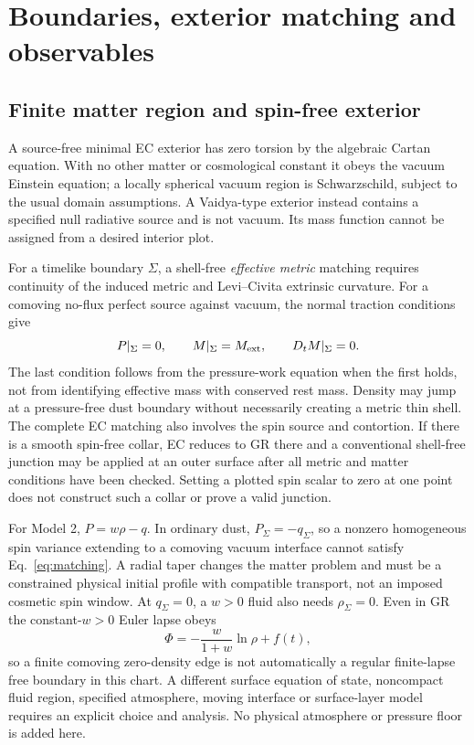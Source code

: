 \section{Boundaries, exterior matching and observables}
\subsection{Finite matter region and spin-free exterior}
A source-free minimal EC exterior has zero torsion by the algebraic Cartan equation. With no other matter or cosmological constant it obeys the vacuum Einstein equation; a locally spherical vacuum region is Schwarzschild, subject to the usual domain assumptions. A Vaidya-type exterior instead contains a specified null radiative source and is not vacuum. Its mass function cannot be assigned from a desired interior plot.

For a timelike boundary $\Sigma$, a shell-free \emph{effective metric} matching requires continuity of the induced metric and Levi--Civita extrinsic curvature. For a comoving no-flux perfect source against vacuum, the normal traction conditions give
\begin{equation}\label{eq:matching}
 P|_\Sigma=0,\qquad M|_\Sigma=M_{\rm ext},\qquad D_t M|_\Sigma=0.
\end{equation}
The last condition follows from the pressure-work equation when the first holds, not from identifying effective mass with conserved rest mass. Density may jump at a pressure-free dust boundary without necessarily creating a metric thin shell. The complete EC matching also involves the spin source and contortion. If there is a smooth spin-free collar, EC reduces to GR there and a conventional shell-free junction may be applied at an outer surface after all metric and matter conditions have been checked. Setting a plotted spin scalar to zero at one point does not construct such a collar or prove a valid junction.

For Model 2, $P=w\rho-q$. In ordinary dust, $P_\Sigma=-q_\Sigma$, so a nonzero homogeneous spin variance extending to a comoving vacuum interface cannot satisfy Eq.~\eqref{eq:matching}. A radial taper changes the matter problem and must be a constrained physical initial profile with compatible transport, not an imposed cosmetic spin window. At $q_\Sigma=0$, a $w>0$ fluid also needs $\rho_\Sigma=0$. Even in GR the constant-$w>0$ Euler lapse obeys
\begin{equation}
 \Phi=-\frac{w}{1+w}\ln\rho+f(t),
\end{equation}
so a finite comoving zero-density edge is not automatically a regular finite-lapse free boundary in this chart. A different surface equation of state, noncompact fluid region, specified atmosphere, moving interface or surface-layer model requires an explicit choice and analysis. No physical atmosphere or pressure floor is added here.

